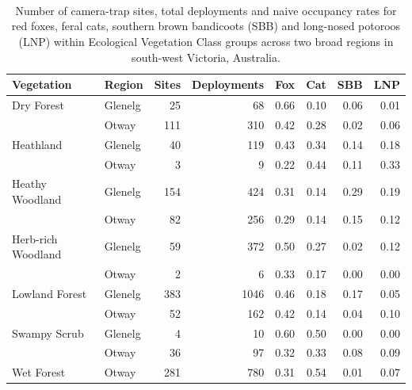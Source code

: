 \documentclass[11pt,a4paper,titlepage,twoside,openright]{style/unimelbthesis}
\begin{document}
\begin{mainmatter}
\(~\)

\(~\)

\(~\)

\begingroup\fontsize{10}{12}\selectfont
\begin{longtable}[t]{llrrrrrr}
\caption{\label{tab:occ-stats-tab}Number of camera-trap sites, total deployments and naive occupancy rates for red foxes, feral cats, southern brown bandicoots (SBB) and long-nosed potoroos (LNP) within Ecological Vegetation Class groups across two broad regions in south-west Victoria, Australia.}\\
\toprule
Vegetation & Region & Sites & Deployments & Fox & Cat & SBB & LNP\\
\midrule
Dry Forest & Glenelg & 25 & 68 & 0.66 & 0.10 & 0.06 & 0.01\\
 & Otway & 111 & 310 & 0.42 & 0.28 & 0.02 & 0.06\\
Heathland & Glenelg & 40 & 119 & 0.43 & 0.34 & 0.14 & 0.18\\
 & Otway & 3 & 9 & 0.22 & 0.44 & 0.11 & 0.33\\
Heathy Woodland & Glenelg & 154 & 424 & 0.31 & 0.14 & 0.29 & 0.19\\
\addlinespace
 & Otway & 82 & 256 & 0.29 & 0.14 & 0.15 & 0.12\\
Herb-rich Woodland & Glenelg & 59 & 372 & 0.50 & 0.27 & 0.02 & 0.12\\
 & Otway & 2 & 6 & 0.33 & 0.17 & 0.00 & 0.00\\
Lowland Forest & Glenelg & 383 & 1046 & 0.46 & 0.18 & 0.17 & 0.05\\
 & Otway & 52 & 162 & 0.42 & 0.14 & 0.04 & 0.10\\
\addlinespace
Swampy Scrub & Glenelg & 4 & 10 & 0.60 & 0.50 & 0.00 & 0.00\\
 & Otway & 36 & 97 & 0.32 & 0.33 & 0.08 & 0.09\\
Wet Forest & Otway & 281 & 780 & 0.31 & 0.54 & 0.01 & 0.07\\
\bottomrule
\end{longtable}
\endgroup{}

\newpage

\(~\)

\(~\)

\(~\)
\begin{figure}


\end{figure}
\end{mainmatter}
\end{document}
